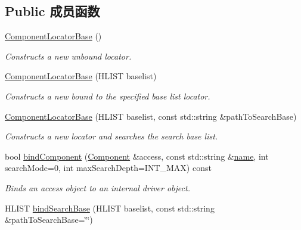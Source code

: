 \subsection*{Public 成员函数}
\begin{DoxyCompactItemize}
\item 
\hypertarget{classmv_i_m_p_a_c_t_1_1acquire_1_1_component_locator_base_aacf80105a85ffd855ed86ff9264d32b9}{\hyperlink{classmv_i_m_p_a_c_t_1_1acquire_1_1_component_locator_base_aacf80105a85ffd855ed86ff9264d32b9}{Component\+Locator\+Base} ()}\label{classmv_i_m_p_a_c_t_1_1acquire_1_1_component_locator_base_aacf80105a85ffd855ed86ff9264d32b9}

\begin{DoxyCompactList}\small\item\em Constructs a new unbound locator. \end{DoxyCompactList}\item 
\hyperlink{classmv_i_m_p_a_c_t_1_1acquire_1_1_component_locator_base_aaa11bc27e6ff9370eb572772067572de}{Component\+Locator\+Base} (H\+L\+I\+S\+T baselist)
\begin{DoxyCompactList}\small\item\em Constructs a new bound to the specified base list locator. \end{DoxyCompactList}\item 
\hyperlink{classmv_i_m_p_a_c_t_1_1acquire_1_1_component_locator_base_a480f09bcdf478c9ed417d69d507ba6bb}{Component\+Locator\+Base} (H\+L\+I\+S\+T baselist, const std\+::string \&path\+To\+Search\+Base)
\begin{DoxyCompactList}\small\item\em Constructs a new locator and searches the search base list. \end{DoxyCompactList}\item 
bool \hyperlink{classmv_i_m_p_a_c_t_1_1acquire_1_1_component_locator_base_a07a75604e54c78ff772d9e0731c8a318}{bind\+Component} (\hyperlink{classmv_i_m_p_a_c_t_1_1acquire_1_1_component}{Component} \&access, const std\+::string \&\hyperlink{classmv_i_m_p_a_c_t_1_1acquire_1_1_component_access_aee8b40bfc45b5752e03570afaadce217}{name}, int search\+Mode=0, int max\+Search\+Depth=I\+N\+T\+\_\+\+M\+A\+X) const 
\begin{DoxyCompactList}\small\item\em Binds an access object to an internal driver object. \end{DoxyCompactList}\item 
H\+L\+I\+S\+T \hyperlink{classmv_i_m_p_a_c_t_1_1acquire_1_1_component_locator_base_aa61ea409ece7907085014ea9ab724a90}{bind\+Search\+Base} (H\+L\+I\+S\+T baselist, const std\+::string \&path\+To\+Search\+Base=\char`\"{}\char`\"{})

\end{DoxyCompactItemize}
